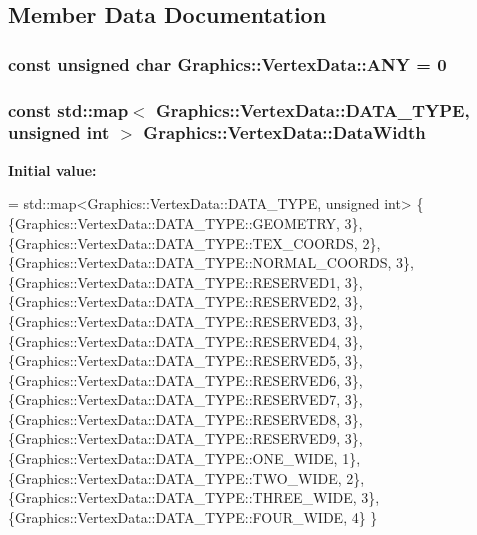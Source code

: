 \subsection{Member Data Documentation}
\hypertarget{class_graphics_1_1_vertex_data_a0fc546e15f8fc02868e94246b93dd1b5}{}
\subsubsection[{A\+N\+Y}]{\setlength{\rightskip}{0pt plus 5cm}const unsigned char Graphics\+::\+Vertex\+Data\+::\+A\+N\+Y = 0\hspace{0.3cm}{\ttfamily [private]}}\label{class_graphics_1_1_vertex_data_a0fc546e15f8fc02868e94246b93dd1b5}
\hypertarget{class_graphics_1_1_vertex_data_af49335b9e9bb94a48d1ade3e798278eb}{}
\subsubsection[{Data\+Width}]{\setlength{\rightskip}{0pt plus 5cm}const std\+::map$<$ {\bf Graphics\+::\+Vertex\+Data\+::\+D\+A\+T\+A\+\_\+\+T\+Y\+P\+E}, unsigned int $>$ Graphics\+::\+Vertex\+Data\+::\+Data\+Width\hspace{0.3cm}{\ttfamily [static]}}\label{class_graphics_1_1_vertex_data_af49335b9e9bb94a48d1ade3e798278eb}
{\bfseries Initial value\+:}
\begin{DoxyCode}
= std::map<Graphics::VertexData::DATA\_TYPE, unsigned int>  \{
        \{Graphics::VertexData::DATA\_TYPE::GEOMETRY, 3\},
        \{Graphics::VertexData::DATA\_TYPE::TEX\_COORDS, 2\},
        \{Graphics::VertexData::DATA\_TYPE::NORMAL\_COORDS, 3\},
        \{Graphics::VertexData::DATA\_TYPE::RESERVED1, 3\},
        \{Graphics::VertexData::DATA\_TYPE::RESERVED2, 3\},
        \{Graphics::VertexData::DATA\_TYPE::RESERVED3, 3\},
        \{Graphics::VertexData::DATA\_TYPE::RESERVED4, 3\},
        \{Graphics::VertexData::DATA\_TYPE::RESERVED5, 3\},
        \{Graphics::VertexData::DATA\_TYPE::RESERVED6, 3\},
        \{Graphics::VertexData::DATA\_TYPE::RESERVED7, 3\},
        \{Graphics::VertexData::DATA\_TYPE::RESERVED8, 3\},
        \{Graphics::VertexData::DATA\_TYPE::RESERVED9, 3\},
        \{Graphics::VertexData::DATA\_TYPE::ONE\_WIDE, 1\},
        \{Graphics::VertexData::DATA\_TYPE::TWO\_WIDE, 2\},
        \{Graphics::VertexData::DATA\_TYPE::THREE\_WIDE, 3\},
        \{Graphics::VertexData::DATA\_TYPE::FOUR\_WIDE, 4\}
  \}
\end{DoxyCode}
\hypertarget{class_graphics_1_1_vertex_data_a4a88da3318b4c8deff9fa6168e75dd0a}{}
